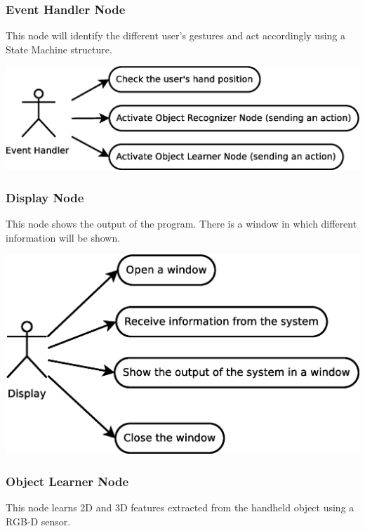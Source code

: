 \documentclass{article}
\begin{document}
\subsubsection{Event Handler Node}
	This node will identify the different user's gestures and act accordingly using a State Machine structure. 
	\begin{center}
		\includegraphics[scale=0.4]{../diagrams/images/uc_event_handler.eps}
	\end{center}
	
\subsubsection{Display Node}
This node shows the output of the program. There is a window in which different information will be shown. 
	\begin{center}
		\includegraphics[scale=0.4]{../diagrams/images/uc_display.eps}
	\end{center}
	
\subsubsection{Object Learner Node}

\hspace{0.5cm}This node learns 2D and 3D features extracted from the handheld object using a RGB-D sensor.   
\end{document}
